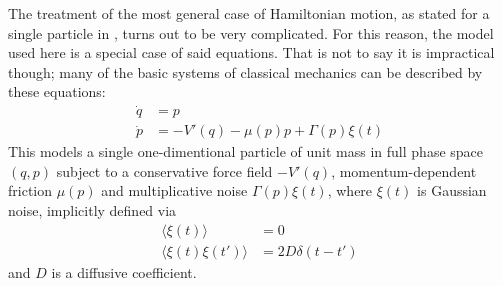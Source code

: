The treatment of the most general case of Hamiltonian motion, as stated for a single particle in , turns out to be very complicated. For this reason, the model used here is a special case of said equations. That is not to say it is impractical though; many of the basic systems of classical mechanics can be described by these equations:
%
\begin{equation}\boxed{\begin{split}
	\label{eqn:model hamiltonian eqns of motion}
	\dot q &= p \\
	\dot p &= -V'(q) - \mu(p)p + \Gamma(p)\xi(t)
\end{split}}\end{equation}
%
This models a single one-dimentional particle of unit mass in full phase space \((q,p)\) subject to a conservative force field \(-V'(q)\), momentum-dependent friction \(\mu(p)\) and multiplicative noise \(\Gamma(p)\xi(t)\), where \(\xi(t)\) is Gaussian noise, implicitly defined via
%
\begin{equation}\begin{split}
	\langle\xi(t)\rangle &= 0 \\
	\langle\xi(t)\xi(t')\rangle &= 2D\delta(t-t')
\end{split}\end{equation}
%
and \(D\) is a diffusive coefficient.

